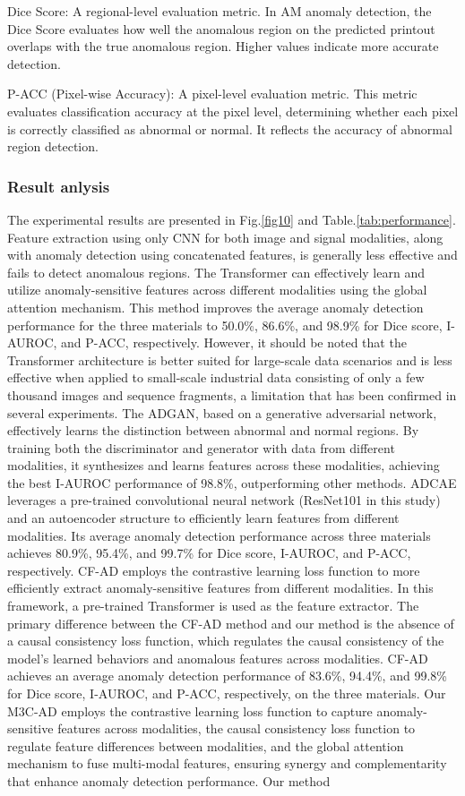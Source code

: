 \documentclass[preprint,12pt]{elsarticle}
\begin{document}
    Dice Score: A regional-level evaluation metric. In AM anomaly detection, the Dice Score evaluates how well the anomalous region on the predicted printout overlaps with the true anomalous region. Higher values indicate more accurate detection.

    P-ACC (Pixel-wise Accuracy): A pixel-level evaluation metric. This metric evaluates classification accuracy at the pixel level, determining whether each pixel is correctly classified as abnormal or normal. It reflects the accuracy of abnormal region detection.

\subsubsection{Result anlysis}   
The experimental results are presented in Fig.\ref{fig10} and Table.\ref{tab:performance}. Feature extraction using only CNN for both image and signal modalities, along with anomaly detection using concatenated features, is generally less effective and fails to detect anomalous regions. The Transformer can effectively learn and utilize anomaly-sensitive features across different modalities using the global attention mechanism. This method improves the average anomaly detection performance for the three materials to 50.0\%, 86.6\%, and 98.9\% for Dice score, I-AUROC, and P-ACC, respectively. However, it should be noted that the Transformer architecture is better suited for large-scale data scenarios and is less effective when applied to small-scale industrial data consisting of only a few thousand images and sequence fragments, a limitation that has been confirmed in several experiments. The ADGAN, based on a generative adversarial network, effectively learns the distinction between abnormal and normal regions. By training both the discriminator and generator with data from different modalities, it synthesizes and learns features across these modalities, achieving the best I-AUROC performance of 98.8\%, outperforming other methods. ADCAE leverages a pre-trained convolutional neural network (ResNet101 in this study) and an autoencoder structure to efficiently learn features from different modalities. Its average anomaly detection performance across three materials achieves 80.9\%, 95.4\%, and 99.7\% for Dice score, I-AUROC, and P-ACC, respectively. CF-AD employs the contrastive learning loss function to more efficiently extract anomaly-sensitive features from different modalities. In this framework, a pre-trained Transformer is used as the feature extractor. The primary difference between the CF-AD method and our method is the absence of a causal consistency loss function, which regulates the causal consistency of the model's learned behaviors and anomalous features across modalities. CF-AD achieves an average anomaly detection performance of 83.6\%, 94.4\%, and 99.8\% for Dice score, I-AUROC, and P-ACC, respectively, on the three materials. Our M3C-AD employs the contrastive learning loss function to capture anomaly-sensitive features across modalities, the causal consistency loss function to regulate feature differences between modalities, and the global attention mechanism to fuse multi-modal features, ensuring synergy and complementarity that enhance anomaly detection performance. Our method 
\end{document}
